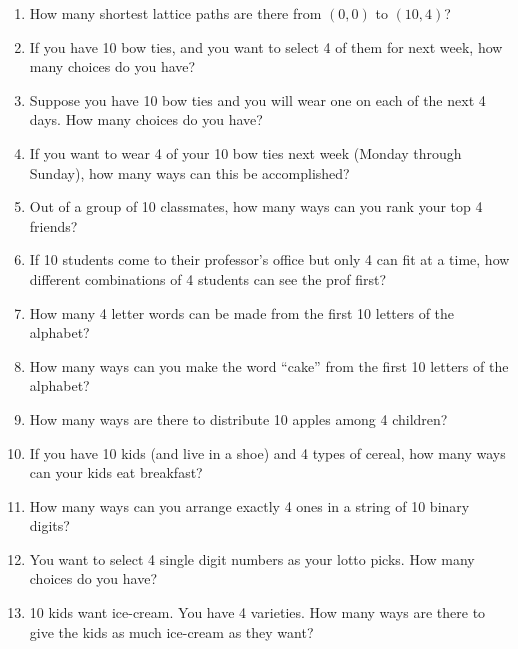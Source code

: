 \documentclass[10pt,]{book}
\theoremstyle{plain}
\theoremstyle{definition}
\theoremstyle{definition}
\theoremstyle{definition}
\numberwithin{equation}{chapter}
\begin{document}
\begin{exerciselist}
          \leavevmode%
\begin{enumerate}[label=(\alph*)]
\item\hypertarget{li-667}{}
                How many shortest lattice paths are there from \((0,0)\) to \((10,4)\)?
\item\hypertarget{li-668}{}
                If you have 10 bow ties, and you want to select 4 of them for next week, how many choices do you have?
\item\hypertarget{li-669}{}
                Suppose you have 10 bow ties and you will wear one on each of the next 4 days. How many choices do you have?
\item\hypertarget{li-670}{}
                If you want to wear 4 of your 10 bow ties next week (Monday through Sunday), how many ways can this be accomplished?
\item\hypertarget{li-671}{}
                Out of a group of 10 classmates, how many ways can you rank your top 4 friends?
\item\hypertarget{li-672}{}
                If 10 students come to their professor's office but only 4 can fit at a time, how different combinations of 4 students can see the prof first?
\item\hypertarget{li-673}{}
                How many 4 letter words can be made from the first 10 letters of the alphabet?
\item\hypertarget{li-674}{}
                How many ways can you make the word ``cake'' from the first 10 letters of the alphabet?
\item\hypertarget{li-675}{}
                How many ways are there to distribute 10 apples among 4 children?
\item\hypertarget{li-676}{}
                If you have 10 kids (and live in a shoe) and 4 types of cereal, how many ways can your kids eat breakfast?
\item\hypertarget{li-677}{}
                How many ways can you arrange exactly 4 ones in a string of 10 binary digits?
\item\hypertarget{li-678}{}
                You want to select 4 single digit numbers as your lotto picks. How many choices do you have?
\item\hypertarget{li-679}{}
                10 kids want ice-cream. You have 4 varieties. How many ways are there to give the kids as much ice-cream as they want?

\end{enumerate}
\end{exerciselist}
\end{document}
